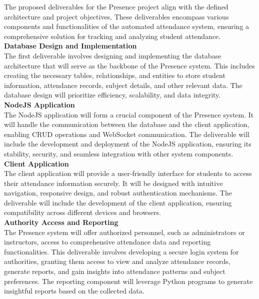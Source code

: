 The proposed deliverables for the Presence project align with the defined architecture and project objectives. These deliverables encompass various components and functionalities of the automated attendance system, ensuring a comprehensive solution for tracking and analyzing student attendance.\\

\textbf{Database Design and Implementation}\\
The first deliverable involves designing and implementing the database architecture that will serve as the backbone of the Presence system. This includes creating the necessary tables, relationships, and entities to store student information, attendance records, subject details, and other relevant data. The database design will prioritize efficiency, scalability, and data integrity.\\

\textbf{NodeJS Application}\\
The NodeJS application will form a crucial component of the Presence system. It will handle the communication between the database and the client application, enabling CRUD operations and WebSocket communication. The deliverable will include the development and deployment of the NodeJS application, ensuring its stability, security, and seamless integration with other system components.\\

\textbf{Client Application}\\
The client application will provide a user-friendly interface for students to access their attendance information securely. It will be designed with intuitive navigation, responsive design, and robust authentication mechanisms. The deliverable will include the development of the client application, ensuring compatibility across different devices and browsers.\\

\textbf{Authority Access and Reporting}\\
The Presence system will offer authorized personnel, such as administrators or instructors, access to comprehensive attendance data and reporting functionalities. This deliverable involves developing a secure login system for authorities, granting them access to view and analyze attendance records, generate reports, and gain insights into attendance patterns and subject preferences. The reporting component will leverage Python programs to generate insightful reports based on the collected data.